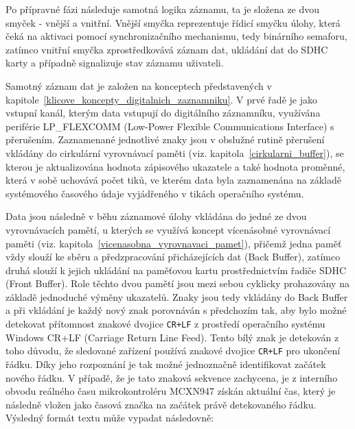 Po přípravné fázi následuje samotná logika záznamu, ta je složena ze dvou smyček - vnější a vnitřní. Vnější smyčka reprezentuje řídicí smyčku úlohy, která čeká na aktivaci pomocí synchronizačního mechanismu, tedy binárního semaforu, zatímco vnitřní smyčka zprostředkovává záznam dat, ukládání dat do SDHC karty a případně signalizuje stav záznamu uživateli.

Samotný záznam dat je založen na konceptech představených v kapitole~\ref{klicove_koncepty_digitalnich_zaznamniku}. V prvé řadě je jako vstupní kanál, kterým data vstupují do digitálního záznamníku, využívána periférie LP\_FLEXCOMM (Low-Power Flexible Communications Interface) s přerušením. Zaznamenané jednotlivé znaky jsou v obslužné rutině přerušení vkládány do cirkulární vyrovnávací paměti (viz. kapitola~\ref{cirkularni_buffer}), se kterou je aktualizována hodnota zápisového ukazatele a také hodnota proměnné, která v sobě uchovává počet tiků, ve kterém data byla zaznamenána na základě systémového časového údaje vyjádřeného v tikách operačního systému.

\newpage

Data jsou následně v běhu záznamové úlohy vkládána do jedné ze dvou vyrovnávacích pamětí, u kterých se využívá koncept vícenásobné vyrovnávací paměti (viz. kapitola~\ref{vicenasobna_vyrovnavaci_pamet}), přičemž jedna paměť vždy slouží ke sběru a předzpracování přicházejících dat (Back Buffer), zatímco druhá slouží k jejich ukládání na paměťovou kartu prostřednictvím řadiče SDHC (Front Buffer). Role těchto dvou pamětí jsou mezi sebou cyklicky prohazovány na základě jednoduché výměny ukazatelů. Znaky jsou tedy vkládány do Back Buffer a při vkládání je každý nový znak porovnáván s předchozím tak, aby bylo možné detekovat přítomnost znakové dvojice \texttt{CR+LF} z prostředí operačního systému Windows CR+LF (Carriage Return Line Feed). Tento bílý znak je detekován z toho důvodu, že sledované zařízení používá znakové dvojice \texttt{CR+LF} pro ukončení řádku. Díky jeho rozpoznání je tak možné jednoznačně identifikovat začátek nového řádku. V případě, že je tato znaková sekvence zachycena, je z interního obvodu reálného času mikrokontroléru MCXN947 získán aktuální čas, který je následně vložen jako časová značka na začátek právě detekovaného řádku. Výsledný formát textu může vypadat následovně:

